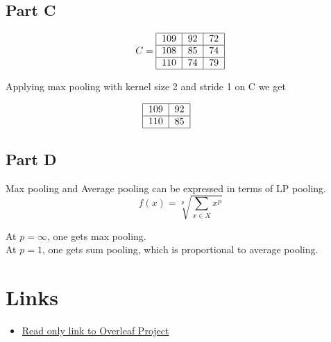 \documentclass{article}
\begin{document}
\subsection*{Part C}

\[
C =  
\begin{tabular}{|c|c|c|} \hline
       109 & 92 & 72 \\ \hline 
       108 & 85 & 74 \\ \hline
       110 & 74 & 79 \\ \hline 
    \end{tabular}
\]

Applying max pooling with kernel size 2 and stride 1 on C we get 

\[
    \begin{tabular}{|c|c|} 
    \hline
       109 & 92 \\ \hline 
       110 & 85 \\ \hline
    \end{tabular}\hspace{1cm}
\]

\subsection*{Part D}
Max pooling and Average pooling can be expressed in terms of LP pooling. \\

\[
f(x) = \sqrt[p]{\sum_{x \in X} x^p}
\]

At $p=\infty$, one gets max pooling.\\
At $p=1$, one gets sum pooling, which is proportional to average pooling. \\


\section*{Links}

\begin{itemize}
    \item \href{https://www.overleaf.com/project/5c799fbd9a370b5cee54dc67}{Read only link to Overleaf Project}
\end{itemize}
\end{document}
